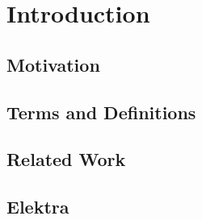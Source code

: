 \chapter{Introduction}

\section{Motivation}

\section{Terms and Definitions}

\section{Related Work}

\section{Elektra}

